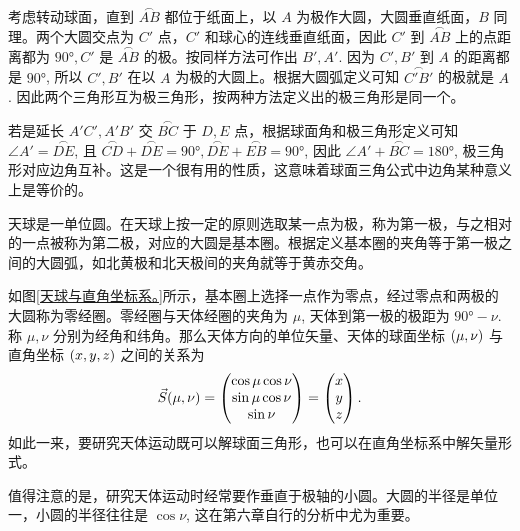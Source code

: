 \documentclass[UTF8, 12pt, a4paper, oneside, onecolumn, fontset=none]{ctexart}
\begin{document}
考虑转动球面，直到 $\overset{\frown}{AB}$ 都位于纸面上，以 $A$ 为极作大圆，大圆垂直纸面，$B$ 同理。两个大圆交点为 $C'$ 点，$C'$ 和球心的连线垂直纸面，因此 $C'$ 到 $\overset{\frown}{AB}$ 上的点距离都为 $\ang{90;;}, C'$ 是 $\overset{\frown}{AB}$ 的极。按同样方法可作出 $B', A'$. 因为 $C', B'$ 到 $A$ 的距离都是 $\ang{90;;}$, 所以 $C', B'$ 在以 $A$ 为极的大圆上。根据大圆弧定义可知 $\overset{\frown}{C'B'}$ 的极就是 $A$. 因此两个三角形互为极三角形，按两种方法定义出的极三角形是同一个。

若是延长 $A'C', A'B'$ 交 $\overset{\frown}{BC}$ 于 $D, E$ 点，根据球面角和极三角形定义可知 $\angle{A'}=\overset{\frown}{DE}$, 且 $\overset{\frown}{CD}+\overset{\frown}{DE}=\ang{90;;},\overset{\frown}{DE}+\overset{\frown}{EB}=\ang{90;;}$, 因此 $\angle{A'}+\overset{\frown}{BC}=\ang{180;;}$, 极三角形对应边角互补。这是一个很有用的性质，这意味着球面三角公式中边角某种意义上是等价的。

天球是一单位圆。在天球上按一定的原则选取某一点为极，称为第一极，与之相对的一点被称为第二极，对应的大圆是基本圈。根据定义基本圈的夹角等于第一极之间的大圆弧，如北黄极和北天极间的夹角就等于黄赤交角。

如图\ref{天球与直角坐标系。}所示，基本圈上选择一点作为零点，经过零点和两极的大圆称为零经圈。零经圈与天体经圈的夹角为 $\mu$, 天体到第一极的极距为 $\ang{90;;}-\nu$. 称 $\mu,\nu$ 分别为经角和纬角。那么天体方向的单位矢量、天体的球面坐标 $\mleft(\mu,\nu\mright)$ 与直角坐标 $\mleft(x, y, z\mright)$ 之间的关系为
\begin{equation}
\vec{S}\mleft(\mu,\nu\mright)=
\begin{pmatrix}
\cos{\mu}\cos{\nu}\\
\sin{\mu}\cos{\nu}\\
\sin{\nu}
\end{pmatrix}=
\begin{pmatrix}
x\\y\\z
\end{pmatrix}.
\end{equation}
如此一来，要研究天体运动既可以解球面三角形，也可以在直角坐标系中解矢量形式。

值得注意的是，研究天体运动时经常要作垂直于极轴的小圆。大圆的半径是单位一，小圆的半径往往是 $\cos{\nu}$, 这在第六章自行的分析中尤为重要。
\end{document}
